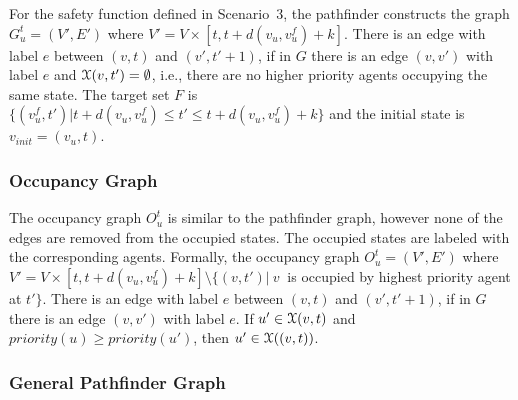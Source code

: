 \begin{eg}\label{eg:collavoid}
For the safety function defined in Scenario~3, the 
pathfinder constructs the graph $G^t_{u} = (V', E')$ where $V'=V\times[t,t+d(v_u,v_u^f)+k]$. There is an edge with label $e$ between $(v,t)$ and $(v',t' +1)$, if in $G$ there is an edge $(v,v')$ with label $e$ and $\mathcal{X}(v,t') = \emptyset$, i.e., there are no higher priority agents occupying the same state. 
The target set $F$ is $\{(v^f_{u} ,t') | t+ d(v_u,v_u^f) \leq t' \leq t + d(v_u,v_u^f) + k\}$ and the initial state is $v_{init} = (v_{u},t)$. %
\end{eg}

\subsubsection*{Occupancy Graph}
The occupancy graph $O^t_u$ is similar to the pathfinder graph, however none of the edges are removed from the occupied states. The occupied states are labeled with the corresponding agents. Formally, the occupancy graph $O^t_{u} = (V', E')$ where $V'=V\times[t,t+d(v_u,v_u^f)+k] \setminus \{(v,t')|~v~$ is occupied by highest priority agent at $ t'\}$. There is an edge with label $e$ between $(v,t)$ and $(v',t' +1)$, if in $G$ there is an edge $(v,v')$ with label $e$. If $u' \in \mathcal{X}(v,t)$ and $priority(u) \geq priority(u')$, then $u' \in \mathcal{X}((v,t))$.  

\subsubsection*{General Pathfinder Graph}


